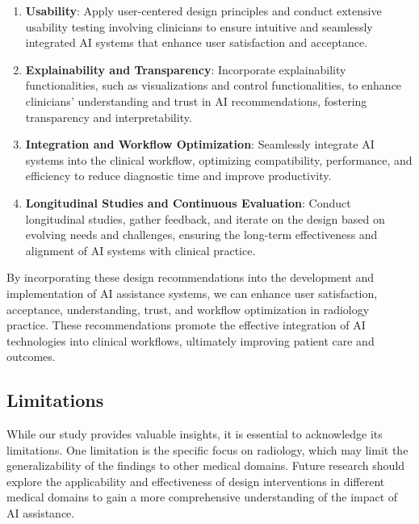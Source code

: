 \begin{enumerate}

\item \textbf{Usability}:
Apply user-centered design principles and conduct extensive usability testing involving clinicians to ensure intuitive and seamlessly integrated \ac{AI} systems that enhance user satisfaction and acceptance.

\vspace{0.025mm}

\item \textbf{Explainability and Transparency}:
Incorporate explainability functionalities, such as visualizations and control functionalities, to enhance clinicians' understanding and trust in \ac{AI} recommendations, fostering transparency and interpretability.

\vspace{0.025mm}

\item \textbf{Integration and Workflow Optimization}:
Seamlessly integrate \ac{AI} systems into the clinical workflow, optimizing compatibility, performance, and efficiency to reduce diagnostic time and improve productivity.

\vspace{0.05mm}

\item \textbf{Longitudinal Studies and Continuous Evaluation}:
Conduct longitudinal studies, gather feedback, and iterate on the design based on evolving needs and challenges, ensuring the long-term effectiveness and alignment of \ac{AI} systems with clinical practice.

\end{enumerate}

\vspace{0.05mm}

By incorporating these design recommendations into the development and implementation of \ac{AI} assistance systems, we can enhance user satisfaction, acceptance, understanding, trust, and workflow optimization in radiology practice.
These recommendations promote the effective integration of \ac{AI} technologies into clinical workflows, ultimately improving patient care and outcomes.

\subsection{Limitations}
\label{sec:chap005007004}

While our study provides valuable insights, it is essential to acknowledge its limitations.
One limitation is the specific focus on radiology, which may limit the generalizability of the findings to other medical domains.
Future research should explore the applicability and effectiveness of design interventions in different medical domains to gain a more comprehensive understanding of the impact of \ac{AI} assistance.

